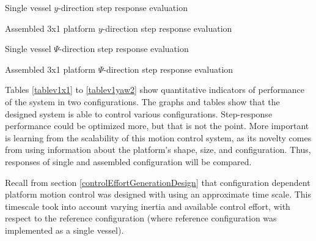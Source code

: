 \begin{table}[H]
	\captionsetup{justification=centering}
	\begin{adjustbox}{max width=1.3\textwidth,center}
		\begin{minipage}{.55\textwidth}
			\centering
			
			\caption{Single vessel $y$-direction step response evaluation}
			\label{tablev1y1}
		\end{minipage}%
		\begin{minipage}{.55\textwidth}
			\centering
			
			\caption{Assembled 3x1 platform $y$-direction step response evaluation}
			\label{tablev1y2}
		\end{minipage}
	\end{adjustbox}
\end{table}

\begin{table}[H]
	\captionsetup{justification=centering}
	\begin{adjustbox}{max width=1.3\textwidth,center}
		\begin{minipage}{.55\textwidth}
			\centering
			
			\caption{Single vessel $\Psi$-direction step response evaluation}
			\label{tablev1yaw1}
		\end{minipage}%
		\begin{minipage}{.55\textwidth}
			\centering
			
			\caption{Assembled 3x1 platform $\Psi$-direction step response evaluation}
			\label{tablev1yaw2}
		\end{minipage}
	\end{adjustbox}
\end{table}


Tables \ref{tablev1x1} to \ref{tablev1yaw2} show quantitative indicators of performance of the system in two configurations. The graphs and tables show that the designed system is able to control various configurations. Step-response performance could be optimized more, but that is not the point. More important is learning from the scalability of this motion control system, as its novelty comes from using information about the platform's shape, size, and configuration. Thus, responses of single and assembled configuration will be compared. 

Recall from section \ref{controlEffortGenerationDesign} that configuration dependent platform motion control was designed with using an approximate time scale. This timescale took into account varying inertia and available control effort, with respect to the reference configuration (where reference configuration was implemented as a single vessel). 

